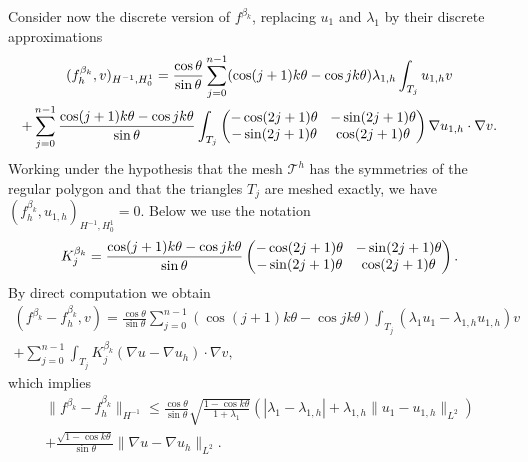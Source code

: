 \documentclass[11pt]{article}
\numberwithin{equation}{section}\newtheorem*{jepEnonce}{\jepEnonceTitle}\newenvironment{enonce*}[1]{\def\jepEnonceTitle{#1}\jepEnonce}{\endjepEnonce}\newtheorem*{conj*}{Conjecture}
\newcommand{\colsep}{\arraycolsep4.5pt}
\theoremstyle{plain}
\theoremstyle{definition}
\begin{document}
Consider now the discrete version of $f^{\beta_k}$, replacing $u_1$ and $\lambda_1$ by their discrete approximations
\vspace*{-8pt}
\begin{multline*}
(f_h^{\beta_k},v)_{H^{-1},H_0^1} = \frac{\cos \theta}{\sin \theta}\sum_{j=0}^{n-1} (\cos(j+1)k\theta-\cos jk\theta) \lambda_{1,h} \int_{T_j} u_{1,h}v\\\colsep
+ \sum_{j=0}^{n-1} \frac{\cos(j+1)k\theta-\cos jk\theta}{\sin \theta} \int_{T_j}\begin{pmatrix}
-\cos (2j+1)\theta & -\sin (2j+1) \theta \\
-\sin (2j+1)\theta & \cos (2j+1)\theta
\end{pmatrix}\nabla u_{1,h} \cdot \nabla v.
\end{multline*}
Working under the hypothesis that the mesh $\mathcal T^h$ has the symmetries of the regular polygon and that the triangles $T_j$ are meshed exactly, we have $(f_h^{\beta_k},u_{1,h})_{H^{-1},H_0^1} = 0$. Below we use the notation
\[\colsep
K_j^{\beta_k} = \frac{\cos(j+1)k\theta-\cos jk\theta}{\sin \theta} \begin{pmatrix}
-\cos (2j+1)\theta & -\sin (2j+1) \theta \\
-\sin(2j+1)\theta & \cos (2j+1)\theta
\end{pmatrix}.
\]
By direct computation we obtain\vspace*{-5pt}
\begin{multline*}
(f^{\beta_k}-f^{\beta_k}_h,v) 
= \frac{\cos \theta}{\sin \theta}\sum_{j=0}^{n-1} (\cos (j+1)k\theta-\cos jk\theta) \int_{T_j}(\lambda_1 u_1-\lambda_{1,h}u_{1,h})v\\
+ \sum_{j=0}^{n-1} \int_{T_j}K_j^{\beta_k}(\nabla u - \nabla u_h)\cdot \nabla v,
\end{multline*}
which implies
\vspace*{-5pt}
\begin{multline*}
\|f^{\beta_k}-f_h^{\beta_k} \|_{H^{-1}}\leq \frac{\cos \theta}{\sin \theta} \sqrt{\frac{1-\cos k\theta}{1+\lambda_1}}(|\lambda_1-\lambda_{1,h}|+\lambda_{1,h}\|u_1-u_{1,h}\|_{L^2}) \\
+ \frac{\sqrt{1-\cos k\theta}}{\sin \theta} \|\nabla u-\nabla u_h\|_{L^2}.
\end{multline*}
\end{document}
